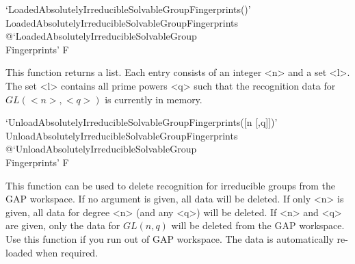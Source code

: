 \>`LoadedAbsolutelyIrreducibleSolvableGroupFingerprints()'%
{LoadedAbsolutelyIrreducibleSolvableGroupFingerprints}%
@{`LoadedAbsolutelyIrreducibleSolvableGroup\\Fingerprints'} F

This function returns a list. Each entry consists of an integer <n> and a set <l>. The set
<l> contains all prime powers <q> such that the recognition data for $GL(<n>, <q>)$ is currently in
memory.

\>`UnloadAbsolutelyIrreducibleSolvableGroupFingerprints([n [,q]])'%
{UnloadAbsolutelyIrreducibleSolvableGroupFingerprints}%
@{`UnloadAbsolutelyIrreducibleSolvableGroup\\Fingerprints'} F

This function can be used to delete recognition for irreducible groups from the GAP workspace. If no
argument is given, all data will be deleted. If only <n> is given, all data for degree <n> (and any
<q>) will be deleted. If <n> and <q> are given, only the data for $GL(n, q)$ will be deleted from the
GAP workspace. Use this function if you run out of GAP workspace. The
data is automatically re-loaded when required.





